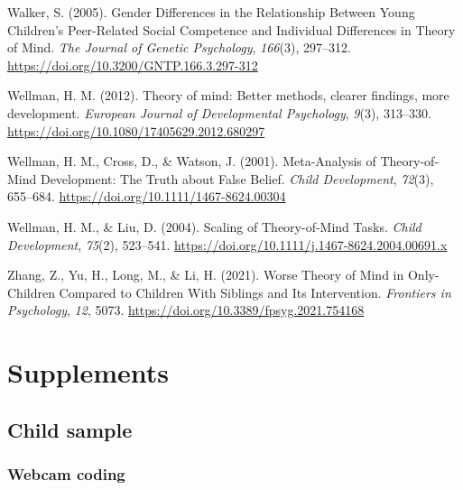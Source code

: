 \documentclass[
  man,floatsintext]{apa6}
\newlength{\cslhangindent}
\newlength{\cslentryspacingunit} %
\newenvironment{CSLReferences}[2] %
 {%
  \setlength{\parindent}{0pt}
  \ifodd #1
  \let\oldpar\par
  \def\par{\hangindent=\cslhangindent\oldpar}
  \fi
  \setlength{\parskip}{#2\cslentryspacingunit}
 }%
 {}
\begin{document}
\begin{CSLReferences}{1}{0}
\leavevmode{}%
Walker, S. (2005). Gender {Differences} in the {Relationship Between Young Children}'s {Peer-Related Social Competence} and {Individual Differences} in {Theory} of {Mind}. \emph{The Journal of Genetic Psychology}, \emph{166}(3), 297--312. \url{https://doi.org/10.3200/GNTP.166.3.297-312}

\leavevmode{}%
Wellman, H. M. (2012). Theory of mind: {Better} methods, clearer findings, more development. \emph{European Journal of Developmental Psychology}, \emph{9}(3), 313--330. \url{https://doi.org/10.1080/17405629.2012.680297}

\leavevmode{}%
Wellman, H. M., Cross, D., \& Watson, J. (2001). Meta-{Analysis} of {Theory-of-Mind Development}: {The Truth} about {False Belief}. \emph{Child Development}, \emph{72}(3), 655--684. \url{https://doi.org/10.1111/1467-8624.00304}

\leavevmode{}%
Wellman, H. M., \& Liu, D. (2004). Scaling of {Theory-of-Mind Tasks}. \emph{Child Development}, \emph{75}(2), 523--541. \url{https://doi.org/10.1111/j.1467-8624.2004.00691.x}

\leavevmode{}%
Zhang, Z., Yu, H., Long, M., \& Li, H. (2021). Worse {Theory} of {Mind} in {Only-Children Compared} to {Children With Siblings} and {Its Intervention}. \emph{Frontiers in Psychology}, \emph{12}, 5073. \url{https://doi.org/10.3389/fpsyg.2021.754168}

\end{CSLReferences}

\endgroup

\newpage

\hypertarget{supplements}{%
\section{Supplements}\label{supplements}}

\hypertarget{child-sample}{%
\subsection{Child sample}\label{child-sample}}

\hypertarget{webcam-coding}{%
\subsubsection{Webcam coding}\label{webcam-coding}}
\end{document}
